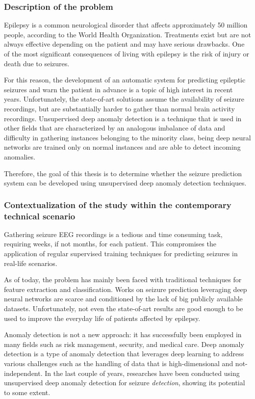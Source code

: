 \subsubsection{Description of the problem}
Epilepsy is a common neurological disorder that affects approximately 50 million people, according to the World Health Organization. Treatments exist but are not always effective depending on the patient and may have serious drawbacks. One of the most significant consequences of living with epilepsy is the risk of injury or death due to seizures.

For this reason, the development of an automatic system for predicting epileptic seizures and warn the patient in advance is a topic of high interest in recent years. Unfortunately, the state-of-art solutions assume the availability of seizure recordings, but are substantially harder to gather than normal brain activity recordings. Unsupervised deep anomaly detection is a technique that is used in other fields that are characterized by an analogous imbalance of data and difficulty in gathering instances belonging to the minority class, being deep neural networks are trained only on normal instances and are able to detect incoming anomalies. 

Therefore, the goal of this thesis is to determine whether the seizure prediction system can be developed using unsupervised deep anomaly detection techniques.


\subsubsection{Contextualization of the study within the contemporary technical scenario}
Gathering seizure EEG recordings is a tedious and time consuming task, requiring weeks, if not months, for each patient. This compromises the application of regular supervised training techniques for predicting seizures in real-life scenarios. 

As of today, the problem has mainly been faced with traditional techniques for feature extraction and classification. Works on seizure prediction leveraging deep neural networks are scarce and conditioned by the lack of big publicly available datasets. Unfortunately, not even the state-of-art results are good enough to be used to improve the everyday life of patients affected by epilepsy.

Anomaly detection is not a new approach: it has successfully been employed in many fields such as risk management, security, and medical care. Deep anomaly detection is a type of anomaly detection that leverages deep learning to address various challenges such as the handling of data that is high-dimensional and not-independent. 
In the last couple of years, researches have been conducted using unsupervised deep anomaly detection for seizure \textit{detection}, showing its potential to some extent. 

